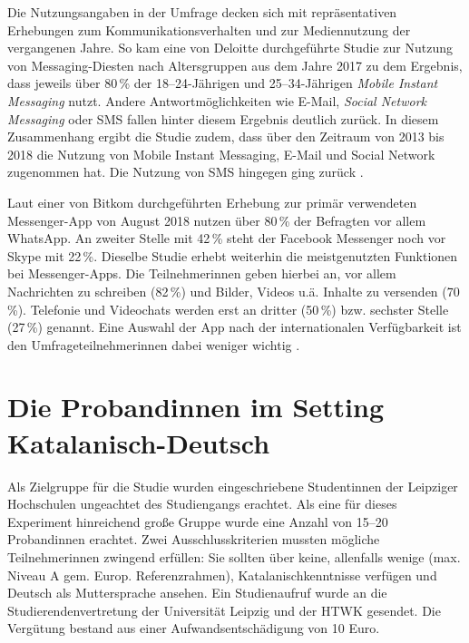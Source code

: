 Die Nutzungsangaben in der Umfrage decken sich mit repräsentativen Erhebungen zum Kommunikationsverhalten und zur Mediennutzung der vergangenen Jahre. So kam eine von Deloitte durchgeführte Studie \citep[]{deloitte_nutzung_2017} zur Nutzung von Messaging-Diesten nach Altersgruppen aus dem Jahre 2017 zu dem Ergebnis, dass jeweils über 80\,\% der 18--24-Jährigen und 25--34-Jährigen \emph{Mobile Instant Messaging} nutzt. Andere Antwortmöglichkeiten wie E-Mail, \emph{Social Network Messaging} oder SMS fallen hinter diesem Ergebnis deutlich zurück. In diesem Zusammenhang ergibt die Studie zudem, dass über den Zeitraum von 2013 bis 2018 die Nutzung von Mobile Instant Messaging, E-Mail und Social Network zugenommen hat. Die Nutzung von SMS hingegen ging zurück \citep[]{deloitte_top_2019}.

\begin{sloppypar}
Laut einer von Bitkom durchgeführten Erhebung zur primär verwendeten Mes\-sen\-ger-App von August 2018 nutzen über 80\,\% der Befragten vor allem WhatsApp. An zweiter Stelle mit 42\,\% steht der Facebook Messenger noch vor Skype mit 22\,\%. Dieselbe Studie erhebt weiterhin die meistgenutzten Funktionen bei Messenger-Apps. Die Teilnehmer{\textperiodcentered}innen geben hierbei an, vor allem Nachrichten zu schreiben (82\,\%) und Bilder, Videos u.ä. Inhalte zu versenden (70\,\%). Telefonie und Videochats werden erst an dritter (50\,\%) bzw. sechster Stelle (27\,\%) genannt. Eine Auswahl der App nach der internationalen Verfügbarkeit ist den Umfrageteilnehmer{\textperiodcentered}innen dabei weniger wichtig \citep[]{joachim_thommes_grose_2018}.
\end{sloppypar}


\section{Die Proband{\textperiodcentered}innen im Setting Katalanisch-Deutsch}
\label{K6:sec:Probandinnen-CatDe}




Als Zielgruppe für die Studie wurden eingeschriebene Student{\textperiodcentered}innen der Leipziger Hochschulen ungeachtet des Studiengangs erachtet. Als eine für dieses Experiment hinreichend große Gruppe wurde eine Anzahl von 15--20 Proband{\textperiodcentered}innen erachtet. Zwei Ausschlusskriterien mussten mögliche Teilnehmer{\textperiodcentered}innen zwingend erfüllen: Sie sollten über keine, allenfalls wenige (max. Niveau A gem. Europ. Referenzrahmen), Katalanischkenntnisse verfügen und Deutsch als Muttersprache ansehen. Ein Studienaufruf wurde an die Studierendenvertretung der Universität Leipzig und der HTWK gesendet. Die Vergütung bestand aus einer Aufwandsentschädigung von 10 Euro.

